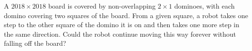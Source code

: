 A $2018 \times 2018$ board is covered by non-overlapping $2 \times 1$ dominoes, with each domino covering two squares of the board. From a given square, a robot takes one step to the other square of the domino it is on and then takes one more step in the same direction.  Could the robot continue moving this way forever without falling off the board?
